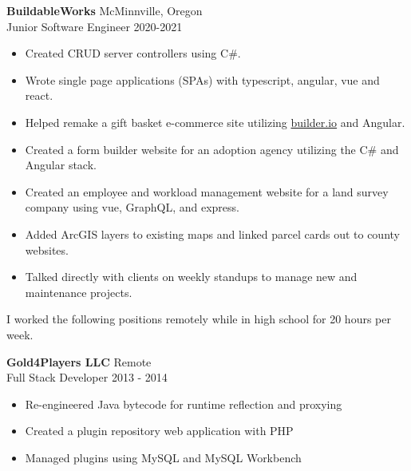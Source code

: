\documentclass[a4paper]{article}
\begin{document}
\vspace{1mm}
\textbf{BuildableWorks} \hfill McMinnville, Oregon \\
Junior Software Engineer \hfill 2020-2021
\vspace{-2mm}
\begin{itemize} \itemsep 1pt
    \item Created CRUD server controllers using C\#.
    \vspace{-1mm}
    \item Wrote single page applications (SPAs) with typescript, angular, vue and react.
    \vspace{-1mm}
    \item Helped remake a gift basket e-commerce site utilizing \href{https://builder.io}{builder.io} and Angular.
    \vspace{-1mm}
    \item Created a form builder website for an adoption agency utilizing the C\# and Angular stack.
    \vspace{-1mm}
    \item Created an employee and workload management website for a land survey company using vue, GraphQL, and express.
    \vspace{-1mm}
    \item Added ArcGIS layers to existing maps and linked parcel cards out to county websites.
    \vspace{-1mm}
    \item Talked directly with clients on weekly standups to manage new and maintenance projects.
    \vspace{-1mm}
\end{itemize}

\vspace{1mm}

I worked the following positions remotely while in high school for 20 hours per week.

\vspace{1mm}

\textbf{Gold4Players LLC} \hfill Remote\\
Full Stack Developer \hfill 2013 - 2014\\
\vspace{-3mm}
\begin{itemize} \itemsep 1pt
	\item Re-engineered Java bytecode for runtime reflection and proxying
	\vspace{-1mm}
	\item Created a plugin repository web application with PHP
	\vspace{-1mm}
	\item Managed plugins using MySQL and MySQL Workbench
\end{itemize}
\end{document}
